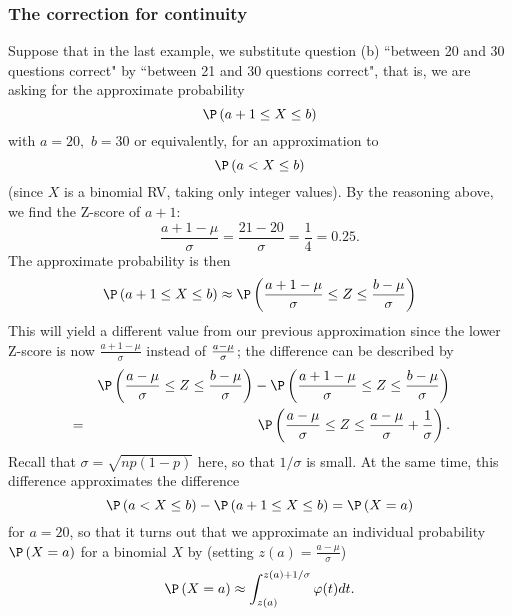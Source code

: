 \subsubsection{The correction for continuity}\label{S:CorrectionForContinuity}

Suppose that in the last example, we substitute question (b) ``between 20
and 30 questions correct" by ``between 21 and 30 questions correct", that
is, we are asking for the approximate probability%
\begin{equation*}
\P \left( a+1\leq X\leq b\right)
\end{equation*}%
with $a=20,$ $b=30$ or equivalently, for an approximation to 
\begin{equation*}
\P \left( a<X\leq b\right)
\end{equation*}%
(since $X$ is a binomial RV, taking only integer values). By the reasoning
above, we find the Z-score of $a+1$:%
\begin{equation*}
\frac{a+1-\mu }{\sigma }=\frac{21-20}{\sigma }=\frac{1}{4}=0.25.
\end{equation*}%
The approximate probability is then 
\begin{equation*}
\P \left( a+1\leq X\leq b\right) \approx \P \left( \frac{a+1-\mu }{\sigma }%
\leq Z\leq \frac{b-\mu }{\sigma }\right)
\end{equation*}
This will yield a different value from our previous approximation since the
lower Z-score is now $\frac{a+1-\mu }{\sigma }$ instead of $\frac{a-\mu }{%
\sigma }$; the difference can be described by 
\begin{eqnarray*}
&&\P \left( \frac{a-\mu }{\sigma }\leq Z\leq \frac{b-\mu }{\sigma }\right)
-\P \left( \frac{a+1-\mu }{\sigma }\leq Z\leq \frac{b-\mu }{\sigma }\right)
\\
&=&\P \left( \frac{a-\mu }{\sigma }\leq Z\leq \frac{a-\mu }{\sigma }+\frac{1%
}{\sigma }\right) .
\end{eqnarray*}%
Recall that $\sigma =\sqrt{np(1-p)}$ here, so that $1/\sigma $ is small. At
the same time, this difference approximates the difference 
\begin{equation*}
\P \left( a<X\leq b\right) -\P \left( a+1\leq X\leq b\right) =\P \left(
X=a\right)
\end{equation*}%
for $a=20$, so that it turns out that we approximate an individual
probability $\P \left( X=a\right) $ for a binomial $X$ by (setting $z(a)=%
\frac{a-\mu }{\sigma }$) 
\begin{equation}
\P \left( X=a\right) \approx \int_{z(a)}^{z(a)+1/\sigma }\varphi (t)dt.
\label{indiv-probab-approx}
\end{equation}%
